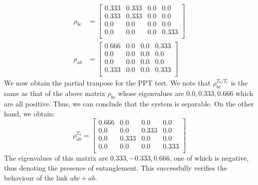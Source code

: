 \documentclass{scrartcl}
\begin{document}
            \begin{align*}
                \rho_{bc} &=
                \left[
                \begin{array}{cccc}
                0.333 & 0.333 & 0.0 & 0.0 \\
                0.333 & 0.333 & 0.0 & 0.0 \\
                0.0 & 0.0 & 0.0 & 0.0 \\
                0.0 & 0.0 & 0.0 & 0.333 \\
                \end{array}
                \right]\\
                \rho_{ab} &=
                    \left[
                    \begin{array}{cccc}
                    0.666 & 0.0 & 0.0 & 0.333 \\
                    0.0 & 0.0 & 0.0 & 0.0 \\
                    0.0 & 0.0 & 0.0 & 0.0 \\
                    0.333 & 0.0 & 0.0 & 0.333 \\
                    \end{array}
                    \right]
                    \end{align*}
                   We now obtain the partial tranpose for the PPT test. We note that $\rho_{bc}^{T_b/T_c}$ is the same as that of the above matrix $\rho_{bc}$ whose eigenvalues are $0.0, 0.333, 0.666$ which are all positive. Thus, we can conclude that the system is separable. On the other hand, we obtain:
                   \begin{equation*}
                    \rho_{ab}^{T_a} =
                    \left[
                    \begin{array}{cccc}
                    0.666 & 0.0 & 0.0 & 0.0 \\
                    0.0 & 0.0 & 0.333 & 0.0 \\
                    0.0 & 0.333 & 0.0 & 0.0 \\
                    0.0 & 0.0 & 0.0 & 0.333 \\
                    \end{array}
                    \right]
                    \end{equation*}
                    The eigenvalues of this matrix are $0.333, -0.333, 0.666$, one of which is negative, thus denoting the presence of entanglement. This successfully verifies the behaviour of the link $abc+ab$. \\[0.3cm]
\end{document}
